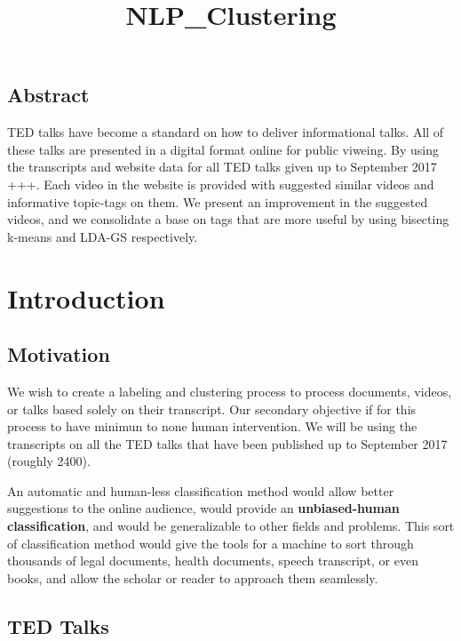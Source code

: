 \documentclass[11pt]{article}
\title{NLP\_Clustering}
\begin{document}
    
    
    \maketitle
    
    

    
    \subsection{Abstract}\label{abstract}

TED talks have become a standard on how to deliver informational talks.
All of these talks are presented in a digital format online for public
viweing. By using the transcripts and website data for all TED talks
given up to September 2017 +++. Each video in the website is provided
with suggested similar videos and informative topic-tags on them. We
present an improvement in the suggested videos, and we consolidate a
base on tags that are more useful by using bisecting k-means and LDA-GS
respectively.

    \section{Introduction}\label{introduction}

\subsection{Motivation}\label{motivation}

We wish to create a labeling and clustering process to process
documents, videos, or talks based solely on their transcript. Our
secondary objective if for this process to have minimun to none human
intervention. We will be using the transcripts on all the TED talks that
have been published up to September 2017 (roughly 2400).

An automatic and human-less classification method would allow better
suggestions to the online audience, would provide an
\textbf{unbiased-human classification}, and would be generalizable to
other fields and problems. This sort of classification method would give
the tools for a machine to sort through thousands of legal documents,
health documents, speech transcript, or even books, and allow the
scholar or reader to approach them seamlessly.

\subsection{TED Talks}\label{ted-talks}
\end{document}
